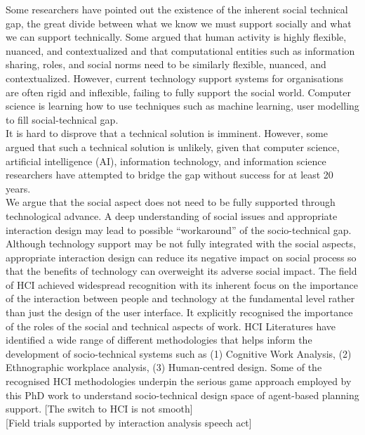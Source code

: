Some researchers have pointed out the existence of the inherent social technical gap, the great divide between what we know we must support socially and what we can support technically.  Some argued that human activity is highly flexible, nuanced, and contextualized and that computational entities such as information sharing, roles, and social norms need to be similarly flexible, nuanced, and contextualized. However, current technology support systems for organisations are often rigid and inflexible, failing to fully support the social world. Computer science is learning how to use techniques such as machine learning, user modelling to fill social-technical gap. \\

It is hard to disprove that a technical solution is imminent. However, some argued that such a technical solution is unlikely, given that computer science, artificial intelligence (AI), information technology, and information science researchers have attempted to bridge the gap without success for at least 20 years. \\

We argue that the social aspect does not need to be fully supported through technological advance. A deep understanding of social issues and appropriate interaction design may lead to possible ``workaround'' of the socio-technical gap. Although technology support may be not fully integrated with the social aspects, appropriate interaction design can reduce its negative impact on social process so that the benefits of technology can overweight its adverse social impact. The field of HCI achieved widespread recognition with its inherent focus on the importance of the interaction between people and technology at the fundamental level rather than just the design of the user interface. It explicitly recognised the importance of the roles of the social and technical aspects of work. HCI Literatures have identified a wide range of different methodologies that helps inform the development of socio-technical systems such as (1) Cognitive Work Analysis, (2) Ethnographic workplace analysis, (3) Human-centred design. Some of the recognised HCI methodologies underpin the serious game approach employed by this PhD work to understand socio-technical design space of agent-based planning support. [The switch to HCI is not smooth]\\

[Field trials supported by interaction analysis  speech act]\\

